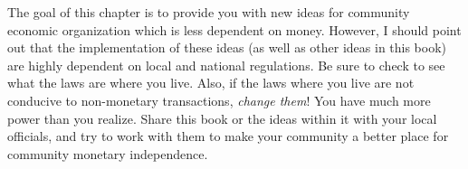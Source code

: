 \begin{infonote}
The goal of this chapter is to provide you with new ideas for community
economic organization which is less dependent on money.  However, I
should point out that the implementation of these ideas (as well as other
ideas in this book) are highly dependent on local and national regulations.
Be sure to check to see what the laws are where you live.  Also, if the
laws where you live are not conducive to non-monetary transactions, 
\textit{change them}!  You have much more power than you realize.  Share
this book or the ideas within it with your local officials, and try to
work with them to make your community a better place for community 
monetary independence.
\end{infonote}
